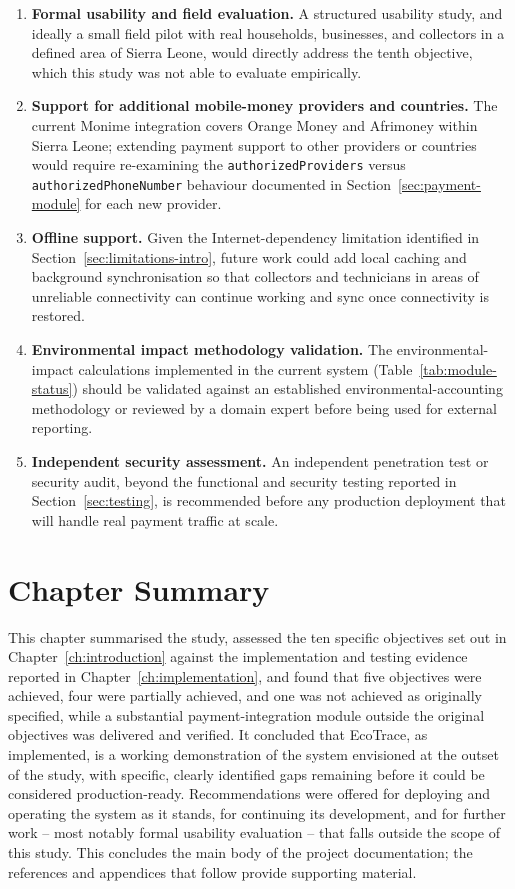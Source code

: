 \begin{enumerate}[leftmargin=1.4cm]
  \item \textbf{Formal usability and field evaluation.} A structured
    usability study, and ideally a small field pilot with real households,
    businesses, and collectors in a defined area of Sierra Leone, would
    directly address the tenth objective, which this study was not able to
    evaluate empirically.
  \item \textbf{Support for additional mobile-money providers and
    countries.} The current Monime integration covers Orange Money and
    Afrimoney within Sierra Leone; extending payment support to other
    providers or countries would require re-examining the
    \texttt{authorizedProviders} versus \texttt{authorizedPhoneNumber}
    behaviour documented in Section~\ref{sec:payment-module} for each new
    provider.
  \item \textbf{Offline support.} Given the Internet-dependency limitation
    identified in Section~\ref{sec:limitations-intro}, future work could
    add local caching and background synchronisation so that collectors
    and technicians in areas of unreliable connectivity can continue
    working and sync once connectivity is restored.
  \item \textbf{Environmental impact methodology validation.} The
    environmental-impact calculations implemented in the current system
    (Table~\ref{tab:module-status}) should be validated against an
    established environmental-accounting methodology or reviewed by a
    domain expert before being used for external reporting.
  \item \textbf{Independent security assessment.} An independent
    penetration test or security audit, beyond the functional and security
    testing reported in Section~\ref{sec:testing}, is recommended before
    any production deployment that will handle real payment traffic at
    scale.
\end{enumerate}

\section{Chapter Summary}

This chapter summarised the study, assessed the ten specific objectives set
out in Chapter~\ref{ch:introduction} against the implementation and testing
evidence reported in Chapter~\ref{ch:implementation}, and found that five
objectives were achieved, four were partially achieved, and one was not
achieved as originally specified, while a substantial payment-integration
module outside the original objectives was delivered and verified. It
concluded that EcoTrace, as implemented, is a working demonstration of the
system envisioned at the outset of the study, with specific, clearly
identified gaps remaining before it could be considered production-ready.
Recommendations were offered for deploying and operating the system as it
stands, for continuing its development, and for further work -- most
notably formal usability evaluation -- that falls outside the scope of this
study. This concludes the main body of the project documentation; the
references and appendices that follow provide supporting material.
